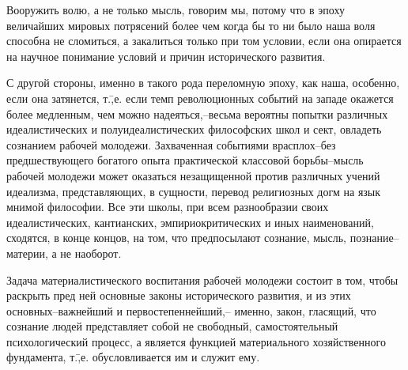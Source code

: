 Вооружить волю, а не только мысль, говорим мы, потому что в эпоху величайших мировых потрясений более чем когда бы то ни было наша воля способна не сломиться, а закалиться только при том условии, если она опирается на научное понимание условий и причин исторического развития.

С другой стороны, именно в такого рода переломную эпоху, как наша, особенно, если она затянется, т.\=,е. если темп революционных событий на западе окажется более медленным, чем можно надеяться,\---весьма вероятны попытки различных идеалистических и полуидеалистических философских школ и сект, овладеть сознанием рабочей молодежи. Захваченная событиями врасплох\---без предшествующего богатого опыта практической классовой борьбы\---мысль рабочей молодежи может оказаться незащищенной против различных учений идеализма, представляющих, в сущности, перевод религиозных догм на язык мнимой философии. Все эти школы, при всем разнообразии своих идеалистических, кантианских, эмпириокритических и иных наименований, сходятся, в конце концов, на том, что предпосылают сознание, мысль, познание\---материи, а не наоборот.

Задача материалистического воспитания рабочей молодежи состоит в том, чтобы раскрыть пред ней основные законы исторического развития, и из этих основных\---важнейший и первостепеннейший,\--- именно, закон, гласящий, что сознание людей представляет собой не свободный, самостоятельный психологический процесс, а является функцией материального хозяйственного фундамента, т.\=,е. обусловливается им и служит ему.

